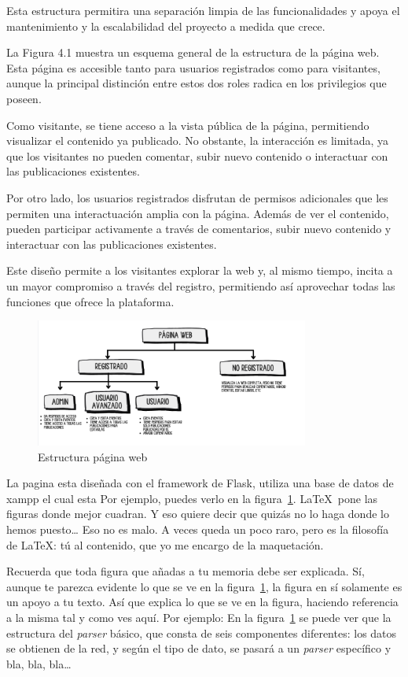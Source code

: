 \documentclass[a4paper, 12pt]{book}
\begin{document}
Esta estructura permitira una separación limpia de las funcionalidades y apoya el mantenimiento y la escalabilidad del proyecto a medida que crece. 


La Figura 4.1 muestra un esquema general de la estructura de la página web. Esta página es accesible tanto para usuarios registrados 
como para visitantes, aunque la principal distinción entre estos dos roles radica en los privilegios que poseen.

Como visitante, se tiene acceso a la vista pública de la página, permitiendo visualizar el contenido ya publicado. No obstante, la interacción 
es limitada, ya que los visitantes no pueden comentar, subir nuevo contenido o interactuar con las publicaciones existentes.

Por otro lado, los usuarios registrados disfrutan de permisos adicionales que les permiten una interactuación amplia con la página. Además de ver el 
contenido, pueden participar activamente a través de comentarios, subir nuevo contenido y interactuar con las publicaciones existentes.

Este diseño permite a los visitantes explorar la web y, al mismo tiempo, incita a un mayor compromiso a través del registro, permitiendo así aprovechar 
todas las funciones que ofrece la plataforma.
\begin{figure}
  \centering
  \includegraphics[width=9cm, keepaspectratio]{img/esquema.png}
  \caption{Estructura página web}
  \label{fig:arquitectura}
\end{figure}

La pagina esta diseñada con el framework de Flask, utiliza una base de datos de xampp el cual esta
Por ejemplo, puedes verlo en la figura~\ref{fig:arquitectura}.
\LaTeX \ pone las figuras donde mejor cuadran. 
Y eso quiere decir que quizás no lo haga donde lo hemos puesto\ldots 
Eso no es malo.
A veces queda un poco raro, pero es la filosofía de \LaTeX: tú al contenido, que yo me encargo de la maquetación.


 
Recuerda que toda figura que añadas a tu memoria debe ser explicada.
Sí, aunque te parezca evidente lo que se ve en la figura~\ref{fig:arquitectura}, la figura en sí solamente es un apoyo a tu texto.
Así que explica lo que se ve en la figura, haciendo referencia a la misma tal y como ves aquí.
Por ejemplo: En la figura~\ref{fig:arquitectura} se puede ver que la estructura del \emph{parser} básico, que consta de seis componentes diferentes: los datos se obtienen de la red, y según el tipo de dato, se pasará a un \emph{parser} específico y bla, bla, bla\ldots
\end{document}
